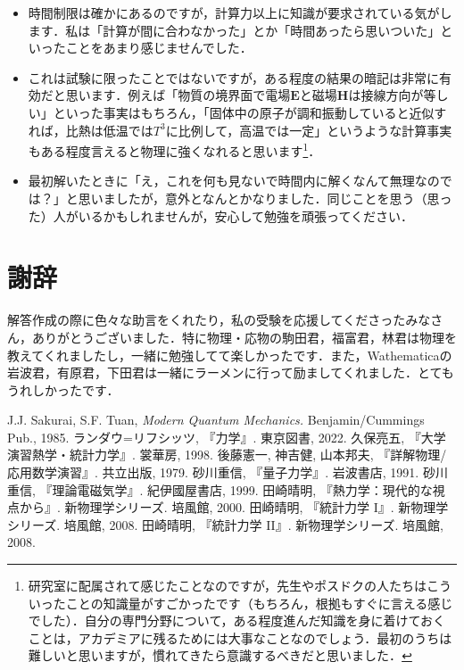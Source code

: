 \documentclass[a4paper,pdflatex,ja=standard]{bxjsarticle}
\begin{document}
\begin{itemize}
  \item 
  時間制限は確かにあるのですが，計算力以上に知識が要求されている気がします．私は「計算が間に合わなかった」とか「時間あったら思いついた」といったことをあまり感じませんでした．

  \item 
  これは試験に限ったことではないですが，ある程度の結果の暗記は非常に有効だと思います．例えば「物質の境界面で電場$\bm{E}$と磁場$\bm{H}$は接線方向が等しい」といった事実はもちろん，「固体中の原子が調和振動していると近似すれば，比熱は低温では$T^3$に比例して，高温では一定」というような計算事実もある程度言えると物理に強くなれると思います\footnote{
    研究室に配属されて感じたことなのですが，先生やポスドクの人たちはこういったことの知識量がすごかったです（もちろん，根拠もすぐに言える感じでした）．自分の専門分野について，ある程度進んだ知識を身に着けておくことは，アカデミアに残るためには大事なことなのでしょう．最初のうちは難しいと思いますが，慣れてきたら意識するべきだと思いました．
  }．

  \item 
  最初解いたときに「え，これを何も見ないで時間内に解くなんて無理なのでは？」と思いましたが，意外となんとかなりました．同じことを思う（思った）人がいるかもしれませんが，安心して勉強を頑張ってください．
\end{itemize}


\section{謝辞}

解答作成の際に色々な助言をくれたり，私の受験を応援してくださったみなさん，ありがとうございました．特に物理・応物の駒田君，福富君，林君は物理を教えてくれましたし，一緒に勉強してて楽しかったです．また，Wathematicaの岩波君，有原君，下田君は一緒にラーメンに行って励ましてくれました．とてもうれしかったです．



\begin{thebibliography}{99}
   J.J. Sakurai, S.F. Tuan, \textit{Modern Quantum Mechanics.} Benjamin/Cummings Pub., 1985.
   ランダウ=リフシッツ, 『力学』. 東京図書, 2022.
   久保亮五, 『大学演習熱学・統計力学』. 裳華房, 1998.
   後藤憲一, 神吉健, 山本邦夫, 『詳解物理/応用数学演習』. 共立出版, 1979.
   砂川重信, 『量子力学』. 岩波書店, 1991.
   砂川重信, 『理論電磁気学』. 紀伊國屋書店, 1999.
   田崎晴明, 『熱力学：現代的な視点から』. 新物理学シリーズ. 培風館, 2000.
   田崎晴明, 『統計力学 I』. 新物理学シリーズ. 培風館, 2008.
   田崎晴明, 『統計力学 II』. 新物理学シリーズ. 培風館, 2008.
\end{thebibliography}
\end{document}
